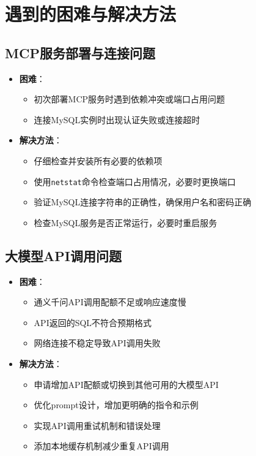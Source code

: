\documentclass{article}
\begin{document}
	\section{遇到的困难与解决方法}
	
	\subsection{MCP服务部署与连接问题}
	\begin{itemize}
		\item \textbf{困难}：
		\begin{itemize}
			\item 初次部署MCP服务时遇到依赖冲突或端口占用问题
			\item 连接MySQL实例时出现认证失败或连接超时
		\end{itemize}
		
		\item \textbf{解决方法}：
		\begin{itemize}
			\item 仔细检查并安装所有必要的依赖项
			\item 使用\texttt{netstat}命令检查端口占用情况，必要时更换端口
			\item 验证MySQL连接字符串的正确性，确保用户名和密码正确
			\item 检查MySQL服务是否正常运行，必要时重启服务
		\end{itemize}
	\end{itemize}
	
	\subsection{大模型API调用问题}
	\begin{itemize}
		\item \textbf{困难}：
		\begin{itemize}
			\item 通义千问API调用配额不足或响应速度慢
			\item API返回的SQL不符合预期格式
			\item 网络连接不稳定导致API调用失败
		\end{itemize}
		
		\item \textbf{解决方法}：
		\begin{itemize}
			\item 申请增加API配额或切换到其他可用的大模型API
			\item 优化prompt设计，增加更明确的指令和示例
			\item 实现API调用重试机制和错误处理
			\item 添加本地缓存机制减少重复API调用
		\end{itemize}
	\end{itemize}
	
\end{document}
